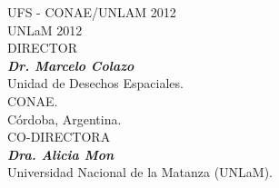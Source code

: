\begin{titlepage}
\begin{center}
\newpage

\thispagestyle{empty}
\vspace*{1cm}
\textcopyright UFS - CONAE/UNLAM 2012\\
\textcopyright UNLaM 2012\\

\vspace*{5cm}
\normalsize DIRECTOR\\
\normalsize\textit{\textbf{Dr. Marcelo Colazo}}\\
Unidad de Desechos Espaciales.\\ CONAE.\\ Córdoba, Argentina.\\
\vspace*{3cm}
\normalsize CO-DIRECTORA\\
\normalsize \textit{\textbf{Dra. Alicia Mon}}\\
Universidad Nacional de la Matanza (UNLaM).\\ 

	
% 



\end{center}
\end{titlepage} 

\newpage
\thispagestyle{empty}
\mbox{}
